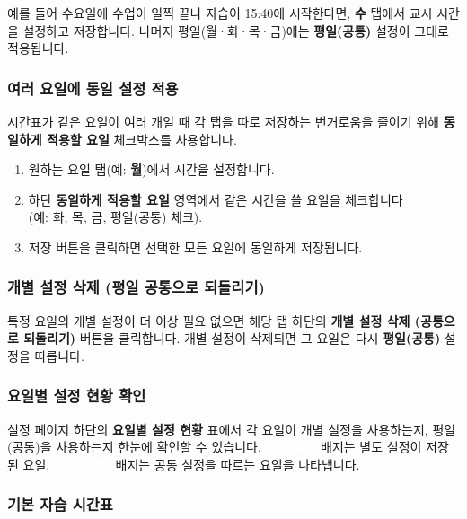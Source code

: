 \documentclass[a4paper,12pt]{article}
\newcommand{\menu}[1]{\textcolor{primary}{\textbf{#1}}}
\newcommand{\badge}[2]{\colorbox{#1}{\small\textcolor{white}{\textbf{#2}}}}
\begin{document}
예를 들어 수요일에 수업이 일찍 끝나 자습이 15:40에 시작한다면,
\menu{수} 탭에서 교시 시간을 설정하고 저장합니다.
나머지 평일(월·화·목·금)에는 \menu{평일(공통)} 설정이 그대로 적용됩니다.

\subsubsection{여러 요일에 동일 설정 적용}

시간표가 같은 요일이 여러 개일 때 각 탭을 따로 저장하는 번거로움을 줄이기 위해
\textbf{동일하게 적용할 요일} 체크박스를 사용합니다.

\begin{enumerate}[leftmargin=1.5em]
    \item 원하는 요일 탭(예: \menu{월})에서 시간을 설정합니다.
    \item 하단 \textbf{동일하게 적용할 요일} 영역에서 같은 시간을 쓸 요일을 체크합니다\\
          (예: 화, 목, 금, 평일(공통) 체크).
    \item 저장 버튼을 클릭하면 선택한 모든 요일에 동일하게 저장됩니다.
\end{enumerate}

\subsubsection{개별 설정 삭제 (평일 공통으로 되돌리기)}

특정 요일의 개별 설정이 더 이상 필요 없으면 해당 탭 하단의
\menu{개별 설정 삭제 (공통으로 되돌리기)} 버튼을 클릭합니다.
개별 설정이 삭제되면 그 요일은 다시 \textbf{평일(공통)} 설정을 따릅니다.

\subsubsection{요일별 설정 현황 확인}

설정 페이지 하단의 \textbf{요일별 설정 현황} 표에서
각 요일이 개별 설정을 사용하는지, 평일(공통)을 사용하는지 한눈에 확인할 수 있습니다.
\badge{success}{개별 설정} 배지는 별도 설정이 저장된 요일,
\badge{secondary}{평일(공통)} 배지는 공통 설정을 따르는 요일을 나타냅니다.

\subsubsection{기본 자습 시간표}
\end{document}
